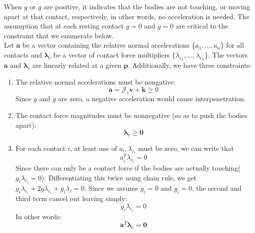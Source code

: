         When $g$ or $\dot{g}$ are positive, it indicates that the bodies are not touching, or moving apart at that contact, respectively, in other words, no acceleration is needed. The assumption that at each resting contact $g = 0$ and $\dot{g} = 0 $ are critical to the constraint that we enumerate below.\\

        Let $\pmb{a}$ be a vector containing the relative normal accelerations \{$a_1,...,a_n$\} for all contacts and $\pmb{\lambda}_c$ be a vector of contact force multipliers \{$\lambda_{c_1},..., \lambda_{c_n}$\}. The vectors $\pmb{a}$ and $\pmb{\lambda}_c$ are linearly related at a given $\mathbf{p}$. Additionally, we have three constraints:
        \begin{enumerate}
            \item The relative normal accelerations must be nongative:
            \begin{equation}
                \pmb{a} = \mathcal{J}_c\dot{\mathbf{v}}+\pmb{k} \ge 0
            \end{equation}
            Since $g$ and $\dot{g}$ are zero, a negative acceleration would cause interpenetration.
            \item The contact force magnitudes must be nonnegative (so as to push the bodies apart): 
            \begin{equation}
                \pmb{\lambda}_c \ge \pmb{0}
            \end{equation}
            \item For each contact $i$, at least one of $a_i, \lambda_{c_i}$ must be zero, we can write that
            \begin{equation}
                a_{i}^{T}\lambda_{c_{i}} = 0
            \end{equation}
            Since there can only be a contact force if the bodies are actually touching($g_i\lambda_{c_i} = 0$). Differentiating this twice using chain rule, we get $\ddot{g}_i\lambda_{c_i} + 2\dot{g}\dot{\lambda}_{c_i} + g_i\lambda_{i} = 0$. Since we assume $g_i = 0$ and $\dot{g}_i = 0$, the second and third term cancel out leaving simply:
            \begin{equation}
                \ddot{g}_i \lambda_{c_i}=0
            \end{equation}
            In other words:
            \begin{equation}
                \pmb{a}^{T}\pmb{\lambda}_{c} = \pmb{0}
            \end{equation}
        \end{enumerate}

